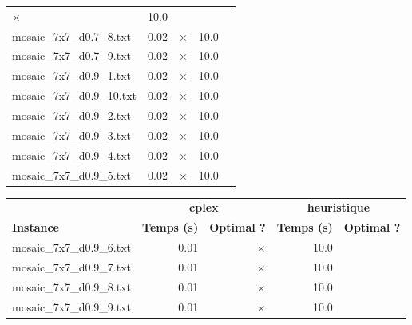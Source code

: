 \documentclass{article}
\begin{document}
\begin{center}
\begin{tabular}{lrrrr}
$\times$
 & 10.0 & 
\\
mosaic\_7x7\_d0.7\_8.txt & 0.02 & 
$\times$
 & 10.0 & 
\\
mosaic\_7x7\_d0.7\_9.txt & 0.02 & 
$\times$
 & 10.0 & 
\\
mosaic\_7x7\_d0.9\_1.txt & 0.02 & 
$\times$
 & 10.0 & 
\\
mosaic\_7x7\_d0.9\_10.txt & 0.02 & 
$\times$
 & 10.0 & 
\\
mosaic\_7x7\_d0.9\_2.txt & 0.02 & 
$\times$
 & 10.0 & 
\\
mosaic\_7x7\_d0.9\_3.txt & 0.02 & 
$\times$
 & 10.0 & 
\\
mosaic\_7x7\_d0.9\_4.txt & 0.02 & 
$\times$
 & 10.0 & 
\\
mosaic\_7x7\_d0.9\_5.txt & 0.02 & 
$\times$
 & 10.0 & 
\\
\hline\end{tabular}
\end{center}

\newpage
\begin{center}
\renewcommand{\arraystretch}{1.4} 
 \begin{tabular}{lrrrr}
	\hline
 & \multicolumn{2}{c}{\textbf{cplex}} & \multicolumn{2}{c}{\textbf{heuristique}}\\
\textbf{Instance}  & \textbf{Temps (s)} & \textbf{Optimal ?}  & \textbf{Temps (s)} & \textbf{Optimal ?} \\\hline

mosaic\_7x7\_d0.9\_6.txt & 0.01 & 
$\times$
 & 10.0 & 
\\
mosaic\_7x7\_d0.9\_7.txt & 0.01 & 
$\times$
 & 10.0 & 
\\
mosaic\_7x7\_d0.9\_8.txt & 0.01 & 
$\times$
 & 10.0 & 
\\
mosaic\_7x7\_d0.9\_9.txt & 0.01 & 
$\times$
 & 10.0 & 
\\
\hline\end{tabular}
\end{center}
\end{document}
